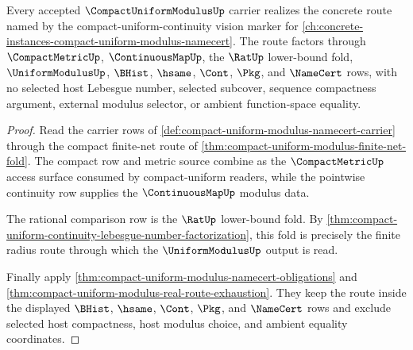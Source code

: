 \begin{theorem}
\label{thm:compact-uniform-continuity-vision-marker-route}
Every accepted $\CompactUniformModulusUp$ carrier realizes the concrete route named by the compact-uniform-continuity vision marker for \autoref{ch:concrete-instances-compact-uniform-modulus-namecert}. The route factors through $\CompactMetricUp$, $\ContinuousMapUp$, the $\RatUp$ lower-bound fold, $\UniformModulusUp$, $\BHist$, $\hsame$, $\Cont$, $\Pkg$, and $\NameCert$ rows, with no selected host Lebesgue number, selected subcover, sequence compactness argument, external modulus selector, or ambient function-space equality.
\end{theorem}
\begin{proof}
Read the carrier rows of \autoref{def:compact-uniform-modulus-namecert-carrier} through the compact finite-net route of \autoref{thm:compact-uniform-modulus-finite-net-fold}. The compact row and metric source combine as the $\CompactMetricUp$ access surface consumed by compact-uniform readers, while the pointwise continuity row supplies the $\ContinuousMapUp$ modulus data.

The rational comparison row is the $\RatUp$ lower-bound fold. By \autoref{thm:compact-uniform-continuity-lebesgue-number-factorization}, this fold is precisely the finite radius route through which the $\UniformModulusUp$ output is read.

Finally apply \autoref{thm:compact-uniform-modulus-namecert-obligations} and \autoref{thm:compact-uniform-modulus-real-route-exhaustion}. They keep the route inside the displayed $\BHist$, $\hsame$, $\Cont$, $\Pkg$, and $\NameCert$ rows and exclude selected host compactness, host modulus choice, and ambient equality coordinates.
\end{proof}

\begin{closurestatus}{\CompactUniformModulusUp}
  \theoryclosure{\seedClosure}
  \formalstatus{\unformalizedV}
\end{closurestatus}
